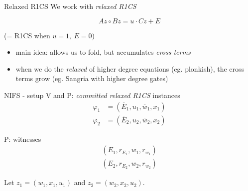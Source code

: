 \documentclass{beamer}
\begin{document}
\begin{frame}{Relaxed R1CS}
  We work with \emph{relaxed R1CS}

$$Az \circ Bz = u \cdot Cz + E$$

\begin{scriptsize} %
(= R1CS when $u=1,~ E=0$)
\end{scriptsize}

\begin{itemize}
  \item main idea: allows us to fold, but accumulates \emph{cross terms}
    \pause
  \item when we do the \emph{relaxed} of higher degree equations (eg. plonkish), the cross terms grow (eg. Sangria with higher degree gates)
\end{itemize}

\end{frame}

\begin{frame}{NIFS - setup}
V and P: \emph{committed relaxed R1CS} instances
\begin{align*}
	\varphi_1&=(\overline{E}_1, u_1, \overline{w}_1, x_1)\\
	\varphi_2&=(\overline{E}_2, u_2, \overline{w}_2, x_2)
\end{align*}

P: witnesses
\begin{align*}
	(E_1, r_{E_1}, w_1, r_{w_1})\\
	(E_2, r_{E_2}, w_2, r_{w_2})
\end{align*}

Let $z_1 = (w_1, x_1, u_1)$ and $z_2 = (w_2, x_2, u_2)$.

\end{frame}
\end{document}
